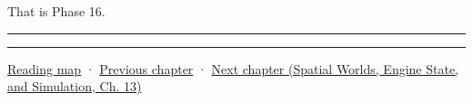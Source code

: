 That is Phase 16.

\begin{center}\rule{0.5\linewidth}{0.5pt}\end{center}

\begin{center}\rule{0.5\linewidth}{0.5pt}\end{center}

\hyperref[volume-reading-map]{Reading map} · \hyperref[05-engine-i-ch011-streaming-resources-through-explicit-states]{Previous chapter} · \href{../05-Spatial-Worlds-Engine-State-and-Simulation/main.pdf\#nameddest=05-engine-i-ch013-portable-startup-windows-events-and-input}{Next chapter (Spatial Worlds, Engine State, and Simulation, Ch. 13)}
